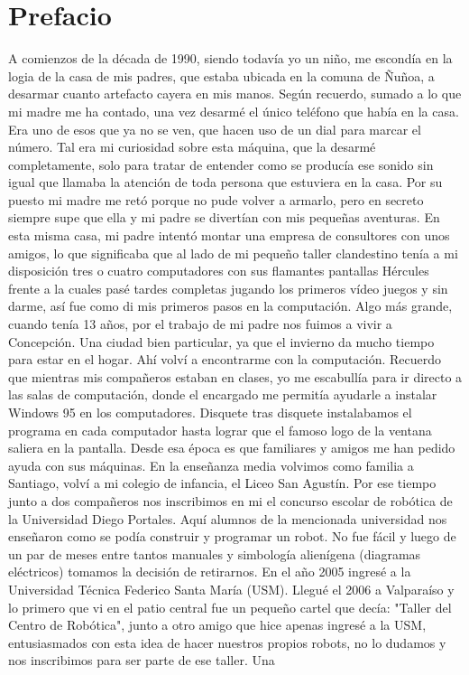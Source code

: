 
\chapter*{Prefacio} %

\label{Prefacio} %


A comienzos de la década de 1990, siendo todavía yo un niño, me escondía en la logia de la casa de mis padres, que estaba ubicada en la comuna de Ñuñoa, a desarmar cuanto artefacto cayera en mis manos. Según recuerdo, sumado a lo que mi madre me ha contado, una vez desarmé el único teléfono que había en la casa. Era uno de esos que ya no se ven, que hacen uso de un dial para marcar el número. Tal era mi curiosidad sobre esta máquina, que la desarmé completamente, solo para tratar de entender como se producía ese sonido sin igual que llamaba la atención de toda persona que estuviera en la casa. Por su puesto mi madre me retó porque no pude volver a armarlo, pero en secreto siempre supe que ella y mi padre se divertían con mis pequeñas aventuras. En esta misma casa, mi padre intentó montar una empresa de consultores con unos amigos, lo que significaba que al lado de mi pequeño taller clandestino tenía a mi disposición tres o cuatro computadores con sus flamantes pantallas Hércules frente a la cuales pasé tardes completas jugando los primeros vídeo juegos y sin darme, así fue como di mis primeros pasos en la computación. Algo más grande, cuando tenía 13 años, por el trabajo de mi padre nos fuimos a vivir a Concepción. Una ciudad bien particular, ya que el invierno da mucho tiempo para estar en el hogar. Ahí volví a encontrarme con la computación. Recuerdo que mientras mis compañeros estaban en clases, yo me escabullía para ir directo a las salas de computación, donde el encargado me permitía ayudarle a instalar Windows 95 en los computadores. Disquete tras disquete instalabamos el programa en cada computador hasta lograr que el famoso logo de la ventana saliera en la pantalla. Desde esa  época es que familiares y amigos me han pedido ayuda con sus máquinas. En la enseñanza media volvimos como familia a Santiago, volví a mi colegio de infancia, el Liceo San Agustín. Por ese tiempo junto a dos compañeros nos inscribimos en mi  el concurso escolar de robótica de la Universidad Diego Portales. Aquí alumnos de la mencionada universidad nos enseñaron como se podía construir y programar un robot. No fue fácil y luego de un par de meses entre tantos manuales y simbología alienígena (diagramas eléctricos) tomamos la decisión de retirarnos. En el año 2005 ingresé a la Universidad Técnica Federico Santa María (USM). Llegué el 2006 a Valparaíso y lo primero que vi en el patio central fue un pequeño cartel que decía: "Taller del Centro de Robótica", junto a otro amigo que hice apenas ingresé a la USM, entusiasmados con esta idea de hacer nuestros propios robots, no lo dudamos y nos inscribimos para ser parte de ese taller. Una 